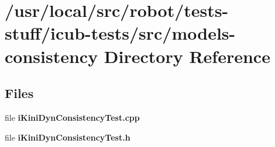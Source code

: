 \section{/usr/local/src/robot/tests-\/stuff/icub-\/tests/src/models-\/consistency Directory Reference}
\label{dir_eccedb847b528abd5832dfd514dc2cd6}
\subsection*{Files}
\begin{DoxyCompactItemize}
\item 
file {\bfseries i\-Kini\-Dyn\-Consistency\-Test.\-cpp}
\item 
file {\bfseries i\-Kini\-Dyn\-Consistency\-Test.\-h}
\end{DoxyCompactItemize}
